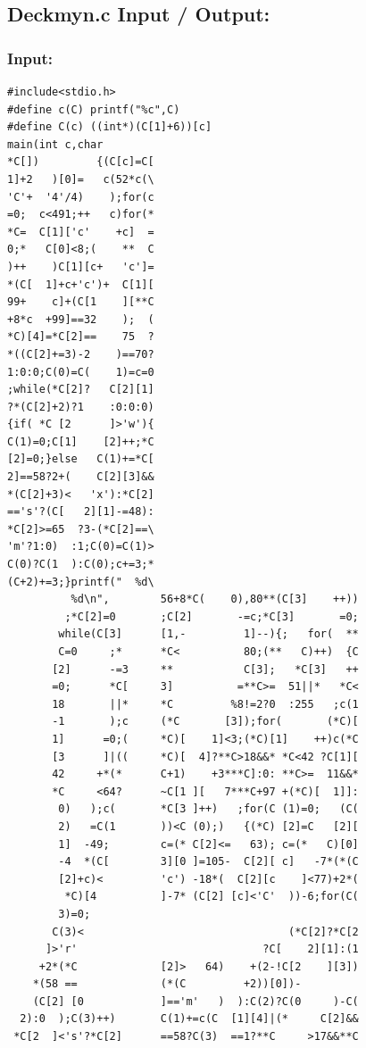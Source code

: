 \documentclass[11pt]{article}
\begin{document}
\pagebreak

\subsection*{Deckmyn.c Input / Output:}
\subsubsection*{Input:}

\begin{lstlisting}
#include<stdio.h>
#define c(C) printf("%c",C)
#define C(c) ((int*)(C[1]+6))[c]
main(int c,char
*C[])         {(C[c]=C[
1]+2   )[0]=   c(52*c(\
'C'+  '4'/4)    );for(c
=0;  c<491;++   c)for(*
*C=  C[1]['c'    +c]  =
0;*   C[0]<8;(    **  C
)++    )C[1][c+   'c']=
*(C[  1]+c+'c')+  C[1][
99+    c]+(C[1    ][**C
+8*c  +99]==32    );  (
*C)[4]=*C[2]==    75  ?
*((C[2]+=3)-2    )==70?
1:0:0;C(0)=C(    1)=c=0
;while(*C[2]?   C[2][1]
?*(C[2]+2)?1    :0:0:0)
{if( *C [2      ]>'w'){
C(1)=0;C[1]    [2]++;*C
[2]=0;}else   C(1)+=*C[
2]==58?2+(    C[2][3]&&
*(C[2]+3)<   'x'):*C[2]
=='s'?(C[   2][1]-=48):
*C[2]>=65  ?3-(*C[2]==\
'm'?1:0)  :1;C(0)=C(1)>
C(0)?C(1  ):C(0);c+=3;*
(C+2)+=3;}printf("  %d\
          %d\n",        56+8*C(    0),80**(C[3]    ++))
         ;*C[2]=0       ;C[2]       -=c;*C[3]       =0;
        while(C[3]      [1,-         1]--){;   for(  **
        C=0     ;*      *C<          80;(**   C)++)  {C
       [2]      -=3     **           C[3];   *C[3]   ++
       =0;      *C[     3]          =**C>=  51||*   *C<
       18       ||*     *C         %8!=2?0  :255   ;c(1
       -1       );c     (*C       [3]);for(       (*C)[
       1]      =0;(     *C)[    1]<3;(*C)[1]    ++)c(*C
       [3      ]|((     *C)[  4]?**C>18&&* *C<42 ?C[1][
       42     +*(*      C+1)    +3***C]:0: **C>=  11&&*
       *C     <64?      ~C[1 ][   7***C+97 +(*C)[  1]]:
        0)   );c(       *C[3 ]++)   ;for(C (1)=0;   (C(
        2)   =C(1       ))<C (0);)   {(*C) [2]=C   [2][
        1]  -49;        c=(* C[2]<=   63); c=(*   C)[0]
        -4  *(C[        3][0 ]=105-  C[2][ c]   -7*(*(C
        [2]+c)<         'c') -18*(  C[2][c    ]<77)+2*(
         *C)[4          ]-7* (C[2] [c]<'C'  ))-6;for(C(
        3)=0;
       C(3)<                                (*C[2]?*C[2
      ]>'r'                             ?C[    2][1]:(1
     +2*(*C             [2]>   64)    +(2-!C[2    ][3])
    *(58 ==             (*(C         +2))[0])-
    (C[2] [0            ]=='m'   )  ):C(2)?C(0     )-C(
  2):0  );C(3)++)       C(1)+=c(C  [1][4]|(*     C[2]&&
 *C[2  ]<'s'?*C[2]      ==58?C(3)  ==1?**C     >17&&**C

\end{lstlisting}
\end{document}
